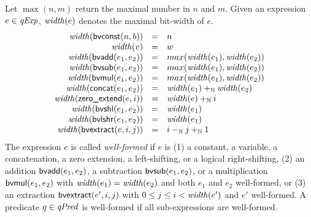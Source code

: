 Let $\max(n, m)$ return the maximal number in $n$ and $m$.
Given an expression $e \in \mathit{qExp}$, $\mathit{width}(e)$ denotes the maximal bit-width of $e$.
\[
\begin{array}{rcl}
\mathit{width}(\mbox{\textsf{bvconst}}(n, b)) & = & n \\
\mathit{width}(v) & = & w \\
\mathit{width}(\mbox{\textsf{bvadd}}(e_1, e_2)) & = & max(\mathit{width}(e_1), \mathit{width}(e_2))\\
\mathit{width}(\mbox{\textsf{bvsub}}(e_1, e_2)) & = & max(\mathit{width}(e_1), \mathit{width}(e_2))\\
\mathit{width}(\mbox{\textsf{bvmul}}(e_1, e_2)) & = & max(\mathit{width}(e_1), \mathit{width}(e_2))\\
\mathit{width}(\mbox{\textsf{concat}}(e_1, e_2)) & = & \mathit{width}(e_1) +_{\mathbb{N}} \mathit{width}(e_2)\\
\mathit{width}(\mbox{\textsf{zero\_extend}}(e, i)) & = & \mathit{width}(e) +_{\mathbb{N}} i \\
\mathit{width}(\mbox{\textsf{bvshl}}(e_1, e_2)) & = & \mathit{width}(e_1) \\
\mathit{width}(\mbox{\textsf{bvlshr}}(e_1, e_2)) & = & \mathit{width}(e_1) \\
\mathit{width}(\mbox{\textsf{bvextract}}(e, i, j)) & = & i -_{\mathbb{N}} j +_{\mathbb{N}} 1 \\
\end{array}
\]
The expression $e$ is called \emph{well-formed} if $e$ is (1) a constant, a variable, a concatenation, a zero extension, a left-shifting, or a logical right-shifting, (2) an addition $\mbox{\textsf{bvadd}}(e_1, e_2)$, a subtraction $\mbox{\textsf{bvsub}}(e_1, e_2)$, or a multiplication $\mbox{\textsf{bvmul}}(e_1, e_2)$ with $\mathit{width}(e_1) = \mathit{width}(e_2)$ and both $e_1$ and $e_2$ well-formed, or (3) an extraction $\mbox{\textsf{bvextract}}(e', i, j)$ with $0 \leq j \leq i < \mathit{width}(e')$ and $e'$ well-formed.
A predicate $q \in \mathit{qPred}$ is well-formed if all sub-expressions are well-formed.

